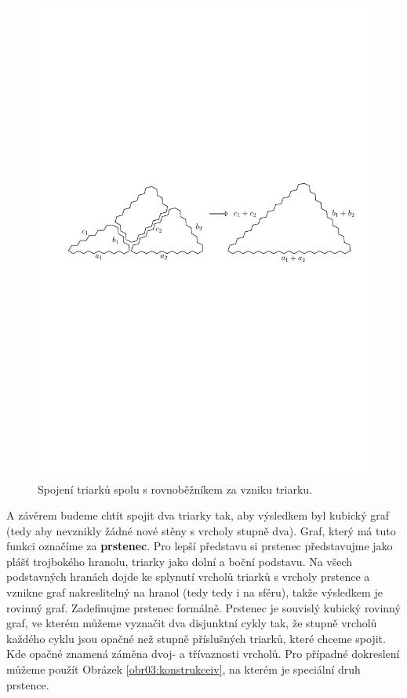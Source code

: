 \begin{figure}[h!]\centering
\includegraphics[width=\textwidth]{../img/T-T}
\caption{Spojení triarků spolu s rovnoběžníkem za vzniku triarku.}
\label{obr22:T-T}
\end{figure}

A závěrem budeme chtít spojit dva triarky tak, aby výsledkem byl kubický graf (tedy aby nevznikly žádné nové stěny s vrcholy stupně dva). Graf, který má tuto funkci označíme za \textbf{prstenec}. Pro lepší představu si prstenec představujme jako plášť trojbokého hranolu, triarky jako dolní a boční podstavu. Na všech podstavných hranách dojde ke splynutí vrcholů triarků s vrcholy prstence a vznikne graf nakreslitelný na hranol (tedy tedy i na sféru), takže výsledkem je rovinný graf. Zadefinujme prstenec formálně. Prstenec je souvislý kubický rovinný graf, ve kterém můžeme vyznačit dva disjunktní cykly tak, že stupně vrcholů každého cyklu jsou opačné než stupně příslušných triarků, které chceme spojit. Kde opačné znamená záměna dvoj- a třívaznosti vrcholů. Pro případné dokreslení můžeme použít Obrázek \ref{obr03:konstrukceiv}, na kterém je speciální druh prstence. 

